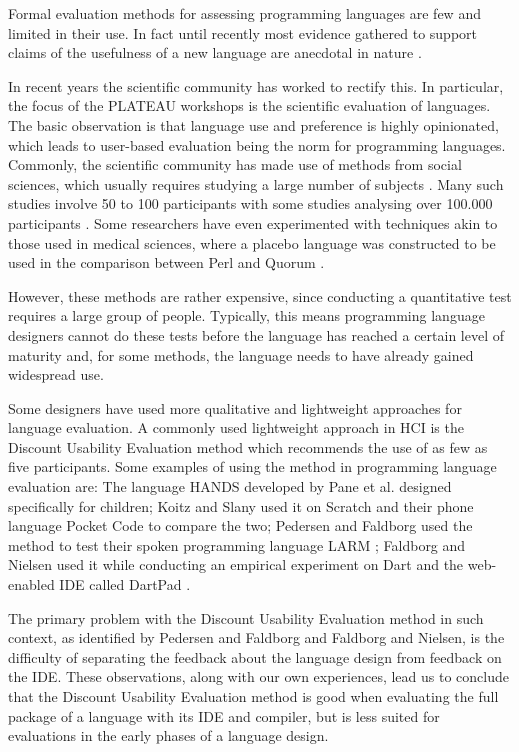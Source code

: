 \documentclass[preprint,10pt]{sigplanconf}
\begin{document}
Formal evaluation methods for assessing programming languages are few and limited in their use. In fact until recently most evidence gathered to support claims of the usefulness of a new language are anecdotal in nature \cite{StakingClaims}. 

In recent years the scientific community has worked to rectify this.
In particular, the focus of the PLATEAU workshops is the scientific evaluation of languages.
The basic observation is that language use and preference is highly opinionated, which leads to user-based evaluation being the norm for programming languages.
Commonly, the scientific community has made use of methods from social sciences, which usually requires studying a large number of subjects \cite{SocioPLT}\cite{AliceCS1}\cite{BlockOrNot}\cite{FromScratch}.
Many such studies involve 50 to 100 participants \cite{hanenberg2010experiment}\cite{EmpStudiesonStimuli} with some studies analysing over 100.000 participants \cite{brown2014investigating}.
Some researchers have even experimented with techniques akin to those used in medical sciences, where a placebo language was constructed to be used in the comparison between Perl and Quorum \cite{stefik2011empirical}.

However, these methods are rather expensive, since conducting a quantitative test requires a large group of people. Typically, this means programming language designers cannot do these tests before the language has reached a certain level of maturity and, for some methods, the language needs to have already gained widespread use. 

Some designers have used more qualitative and lightweight approaches for language evaluation. A commonly used lightweight approach in HCI is the Discount Usability Evaluation method \cite{CooperativeEval} which recommends the use of as few as five participants. Some examples of using the method in programming language evaluation are: The language HANDS developed by Pane et al. \cite{HANDS} designed specifically for children; Koitz and Slany \cite{PocketCode} used it on Scratch and their phone language Pocket Code to compare the two; Pedersen and Faldborg used the method to test their spoken programming language LARM \cite{LARM}; Faldborg and Nielsen used it while conducting an empirical experiment on Dart and the web-enabled IDE called DartPad \cite{DART}.

The primary problem with the Discount Usability Evaluation method in such context, as identified by Pedersen and Faldborg and Faldborg and Nielsen, is the difficulty of separating the feedback about the language design from feedback on the IDE.
These observations, along with our own experiences, lead us to conclude that the Discount Usability Evaluation method is good when evaluating the full package of a language with its IDE and compiler, but is less suited for evaluations in the early phases of a language design.
\end{document}
